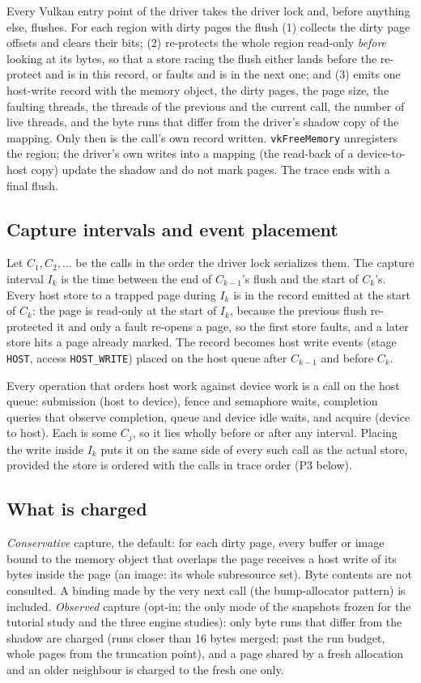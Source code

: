 \documentclass[acmtog,anonymous,review]{acmart}
\newcommand{\code}[1]{\texttt{#1}}
\begin{document}
Every Vulkan entry point of the driver takes the driver lock and, before anything else, flushes. For each region with
dirty pages the flush (1) collects the dirty page offsets and clears their bits; (2) re-protects the whole region
read-only \emph{before} looking at its bytes, so that a store racing the flush either lands before the re-protect and
is in this record, or faults and is in the next one; and (3) emits one host-write record with the memory object, the
dirty pages, the page size, the faulting threads, the threads of the previous and the current call, the number of live
threads, and the byte runs that differ from the driver's shadow copy of the mapping. Only then is the call's own record
written. \code{vkFreeMemory} unregisters the region; the driver's own writes into a mapping (the read-back of a
device-to-host copy) update the shadow and do not mark pages. The trace ends with a final flush.

\subsection{Capture intervals and event placement}
Let $C_1, C_2, \dots$ be the calls in the order the driver lock serializes them. The capture interval $I_k$ is the time
between the end of $C_{k-1}$'s flush and the start of $C_k$'s. Every host store to a trapped page during $I_k$ is in the
record emitted at the start of $C_k$: the page is read-only at the start of $I_k$, because the previous flush
re-protected it and only a fault re-opens a page, so the first store faults, and a later store hits a page already
marked. The record becomes host write events (stage \code{HOST}, access \code{HOST\_WRITE}) placed on the host queue
after $C_{k-1}$ and before $C_k$.

Every operation that orders host work against device work is a call on the host queue: submission (host to device),
fence and semaphore waits, completion queries that observe completion, queue and device idle waits, and acquire
(device to host). Each is some $C_j$, so it lies wholly before or after any interval. Placing the write inside $I_k$
puts it on the same side of every such call as the actual store, provided the store is ordered with the calls in trace
order (P3 below).

\subsection{What is charged}
\emph{Conservative} capture, the default: for each dirty page, every buffer or image bound to the memory object
that overlaps the page receives a host write of its bytes inside the page (an image: its whole subresource set).
Byte contents are not consulted. A binding made by the very next call (the bump-allocator pattern) is included.
\emph{Observed} capture (opt-in; the only mode of the snapshots frozen for the tutorial study and the three engine
studies): only byte runs that differ from the shadow are charged (runs closer
than 16 bytes merged; past the run budget, whole pages from the truncation point), and a page shared by a fresh
allocation and an older neighbour is charged to the fresh one only.
\end{document}
